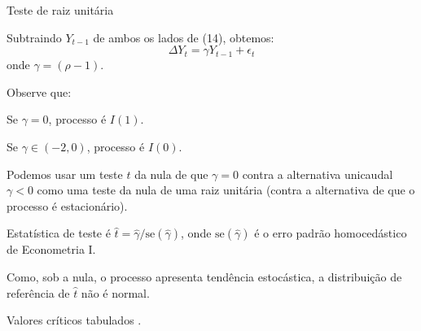 \documentclass[11pt]{beamer}
\newenvironment{halfwideitemize}{\itemize\addtolength{\itemsep}{0.5em}}{\enditemize}
\newenvironment{halfwideenumerate}{\enumerate\addtolength{\itemsep}{0.5em}}{\endenumerate}
\begin{document}
\begin{frame}{Teste de raiz unitária}
	\begin{halfwideitemize}
		\item Subtraindo $Y_{t-1}$ de ambos os lados de (14), obtemos:
		\begin{equation}
			\label{eq_no}
			\Delta Y_t = \gamma Y_{t-1} + \epsilon_t
		\end{equation}
		onde $\gamma = (\rho-1)$.
		\item Observe que:
		\begin{halfwideenumerate}
			\item Se $\gamma = 0$, processo é $I(1)$.
			\item Se $\gamma \in (-2, 0)$, processo é $I(0)$.
		\end{halfwideenumerate}
		\item Podemos usar um teste $t$ da nula de que $\gamma = 0$ contra a alternativa unicaudal $\gamma < 0$ como uma teste da nula de uma raiz unitária (contra a alternativa de que o processo é estacionário).
		\begin{halfwideitemize}
			\item Estatística de teste é $\hat{t} = \hat{\gamma}/\text{se}(\hat{\gamma})$, onde $\text{se}(\hat{\gamma})$ é o erro padrão homocedástico de Econometria I.
		\end{halfwideitemize}
		\item Como, sob a nula, o processo apresenta tendência estocástica, a distribuição de referência de $\hat{t}$ não é normal. \hyperlink{app_donsker}{} \label{main_text}
		\begin{halfwideitemize}
			\item Valores críticos tabulados \citep{Dickey1979}.
		\end{halfwideitemize}
	\end{halfwideitemize}
\end{frame}
\end{document}
